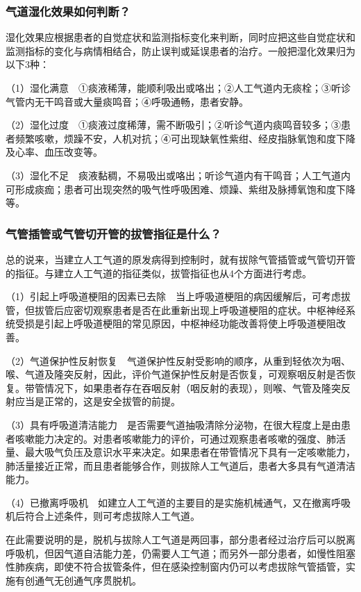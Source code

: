 \subsubsection{气道湿化效果如何判断？}

湿化效果应根据患者的自觉症状和监测指标变化来判断，同时应把这些自觉症状和监测指标的变化与病情相结合，防止误判或延误患者的治疗。一般把湿化效果归为以下3种：

（1）湿化满意　①痰液稀薄，能顺利吸出或咯出；②人工气道内无痰栓；③听诊气管内无干鸣音或大量痰鸣音；④呼吸通畅，患者安静。

（2）湿化过度　①痰液过度稀薄，需不断吸引；②听诊气道内痰鸣音较多；③患者频繁咳嗽，烦躁不安，人机对抗；④可出现缺氧性紫绀、经皮指脉氧饱和度下降及心率、血压改变等。

（3）湿化不足　痰液黏稠，不易吸出或咯出；听诊气道内有干鸣音；人工气道内可形成痰痂；患者可出现突然的吸气性呼吸困难、烦躁、紫绀及脉搏氧饱和度下降等。

\subsubsection{气管插管或气管切开管的拔管指征是什么？}

总的说来，当建立人工气道的原发病得到控制时，就有拔除气管插管或气管切开管的指征。与建立人工气道的指征类似，拔管指征也从4个方面进行考虑。

（1）引起上呼吸道梗阻的因素已去除　当上呼吸道梗阻的病因缓解后，可考虑拔管，但拔管后应密切观察患者是否在此重新出现上呼吸道梗阻的症状。中枢神经系统受损是引起上呼吸道梗阻的常见原因，中枢神经功能改善将使上呼吸道梗阻改善。

（2）气道保护性反射恢复　气道保护性反射受影响的顺序，从重到轻依次为咽、喉、气道及隆突反射，因此，评价气道保护性反射是否恢复，可观察咽反射是否恢复。带管情况下，如果患者存在吞咽反射（咽反射的表现），则喉、气管及隆突反射应当是正常的，这是安全拔管的前提。

（3）具有呼吸道清洁能力　是否需要气道抽吸清除分泌物，在很大程度上是由患者咳嗽能力决定的。对患者咳嗽能力的评价，可通过观察患者咳嗽的强度、肺活量、最大吸气负压及意识水平来决定。如果患者在带管情况下具有一定咳嗽能力，肺活量接近正常，而且患者能够合作，则拔除人工气道后，患者大多具有气道清洁能力。

（4）已撤离呼吸机　如建立人工气道的主要目的是实施机械通气，又在撤离呼吸机后符合上述条件，则可考虑拔除人工气道。

在此需要说明的是，脱机与拔除人工气道是两回事，部分患者经过治疗后可以脱离呼吸机，但因气道自洁能力差，仍需要人工气道；而另外一部分患者，如慢性阻塞性肺疾病，即使不符合拔管条件，但在感染控制窗内仍可以考虑拔除气管插管，实施有创通气无创通气序贯脱机。

